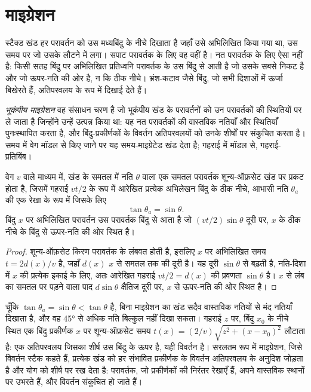 \section{माइग्रेशन}

स्टैक्ड खंड हर परावर्तन को उस मध्यबिंदु के नीचे दिखाता है जहाँ उसे
अभिलिखित किया गया था, उस समय पर जो उसके लौटने में लगा। सपाट परावर्तक के लिए
वह वहीं है। नत परावर्तक के लिए ऐसा नहीं है: किसी सतह बिंदु पर अभिलिखित प्रतिध्वनि
परावर्तक के उस बिंदु से आती है जो उसके सबसे निकट है और जो ऊपर-नति की ओर है,
न कि ठीक नीचे। भ्रंश-कटाव जैसे बिंदु, जो सभी दिशाओं में ऊर्जा
बिखेरते हैं, अतिपरवलय के रूप में दिखाई देते हैं।

\begin{definition}[भूकंपीय माइग्रेशन]\label{def:b3:exploration-seismology:migration}
\emph{भूकंपीय माइग्रेशन} वह संसाधन चरण है जो भूकंपीय खंड के
परावर्तनों को उन परावर्तकों की स्थितियों पर ले जाता है जिन्होंने उन्हें
उत्पन्न किया था: यह नत परावर्तकों की वास्तविक नतियाँ और स्थितियाँ
पुनःस्थापित करता है, और बिंदु-प्रकीर्णकों के विवर्तन अतिपरवलयों को
उनके शीर्षों पर संकुचित करता है। समय में वेग मॉडल से किए जाने पर यह समय-माइग्रेटेड
खंड देता है; गहराई में मॉडल से, गहराई-प्रतिबिंब।
\end{definition}

\begin{theorem}[शून्य-ऑफ़सेट खंड पर नति]\label{thm:b3:exploration-seismology:dip}
वेग $v$ वाले माध्यम में, खंड के समतल में नति $\theta$ वाला एक समतल परावर्तक
शून्य-ऑफ़सेट खंड पर प्रकट होता है, जिसमें गहराई $vt/2$ के रूप में आरेखित
प्रत्येक अभिलेखन बिंदु के ठीक नीचे, आभासी नति $\theta_a$ की एक रेखा के रूप में
जिसके लिए
\[
  \tan\theta_a = \sin\theta .
\]
बिंदु $x$ पर अभिलिखित परावर्तन उस परावर्तक बिंदु से आता है जो
$(vt/2)\sin\theta$ दूरी पर, $x$ के ठीक नीचे के बिंदु से ऊपर-नति की ओर स्थित है।
\end{theorem}

\begin{proof}
शून्य-ऑफ़सेट किरण परावर्तक के लंबवत होती है, इसलिए $x$ पर अभिलिखित समय
$t = 2d(x)/v$ है, जहाँ $d(x)$ $x$ से समतल तक की दूरी है। यह दूरी
$\sin\theta$ से बढ़ती है, नति-दिशा में $x$ की प्रत्येक इकाई के लिए, अतः आरेखित
गहराई $vt/2 = d(x)$ की प्रवणता $\sin\theta$ है। $x$ से लंब का
समतल पर पड़ने वाला पाद $d\sin\theta$ क्षैतिज दूरी पर, $x$ से
ऊपर-नति की ओर स्थित है।
\end{proof}

चूँकि $\tan\theta_a = \sin\theta < \tan\theta$ है, बिना माइग्रेशन का खंड सदैव
वास्तविक नतियों से मंद नतियाँ दिखाता है, और वह
\ang{45} से अधिक नति बिल्कुल नहीं दिखा सकता। गहराई $z$ पर, बिंदु $x_0$ के नीचे स्थित एक बिंदु प्रकीर्णक
$x$ पर शून्य-ऑफ़सेट समय $t(x) = (2/v)\sqrt{z^2 + (x - x_0)^2}$ लौटाता है: एक अतिपरवलय
जिसका शीर्ष उस बिंदु के ऊपर है, यही विवर्तन है। सरलतम रूप में माइग्रेशन,
जिसे विवर्तन स्टैक कहते हैं, प्रत्येक खंड को हर संभावित प्रकीर्णक के विवर्तन अतिपरवलय के
अनुदिश जोड़ता है और योग को शीर्ष पर रख देता है: परावर्तक, जो प्रकीर्णकों की
निरंतर रेखाएँ हैं, अपने वास्तविक स्थानों पर उभरते हैं, और
विवर्तन संकुचित हो जाते हैं।

